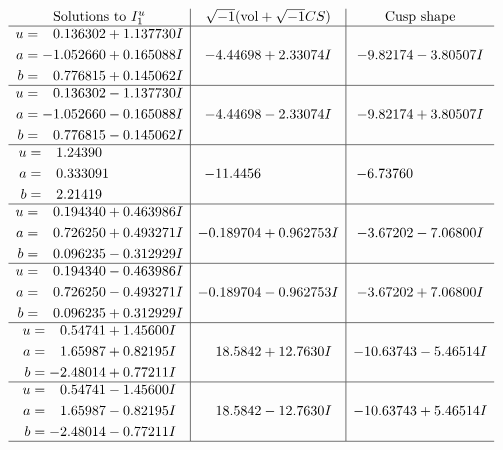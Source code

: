 \documentclass[1p]{elsarticle_modified}
\theoremstyle{definition}
\newcommand{\I}{\sqrt{-1}}
\begin{document}
$$\begin{array}{c|c|c}  
\text{Solutions to }I^u_{1}& \I (\text{vol} + \sqrt{-1}CS) & \text{Cusp shape}\\
 \hline 
\begin{aligned}
u &= \phantom{-}0.136302 + 1.137730 I \\
a &= -1.052660 + 0.165088 I \\
b &= \phantom{-}0.776815 + 0.145062 I\end{aligned}
 & -4.44698 + 2.33074 I & -9.82174 - 3.80507 I \\ \hline\begin{aligned}
u &= \phantom{-}0.136302 - 1.137730 I \\
a &= -1.052660 - 0.165088 I \\
b &= \phantom{-}0.776815 - 0.145062 I\end{aligned}
 & -4.44698 - 2.33074 I & -9.82174 + 3.80507 I \\ \hline\begin{aligned}
u &= \phantom{-}1.24390\phantom{ +0.000000I} \\
a &= \phantom{-}0.333091\phantom{ +0.000000I} \\
b &= \phantom{-}2.21419\phantom{ +0.000000I}\end{aligned}
 & -11.4456\phantom{ +0.000000I} & -6.73760\phantom{ +0.000000I} \\ \hline\begin{aligned}
u &= \phantom{-}0.194340 + 0.463986 I \\
a &= \phantom{-}0.726250 + 0.493271 I \\
b &= \phantom{-}0.096235 - 0.312929 I\end{aligned}
 & -0.189704 + 0.962753 I & -3.67202 - 7.06800 I \\ \hline\begin{aligned}
u &= \phantom{-}0.194340 - 0.463986 I \\
a &= \phantom{-}0.726250 - 0.493271 I \\
b &= \phantom{-}0.096235 + 0.312929 I\end{aligned}
 & -0.189704 - 0.962753 I & -3.67202 + 7.06800 I \\ \hline\begin{aligned}
u &= \phantom{-}0.54741 + 1.45600 I \\
a &= \phantom{-}1.65987 + 0.82195 I \\
b &= -2.48014 + 0.77211 I\end{aligned}
 & \phantom{-}18.5842 + 12.7630 I & -10.63743 - 5.46514 I \\ \hline\begin{aligned}
u &= \phantom{-}0.54741 - 1.45600 I \\
a &= \phantom{-}1.65987 - 0.82195 I \\
b &= -2.48014 - 0.77211 I\end{aligned}
 & \phantom{-}18.5842 - 12.7630 I & -10.63743 + 5.46514 I\\
 \hline 
 \end{array}$$\newpage\newpage\renewcommand{\arraystretch}{1}
\end{document}
